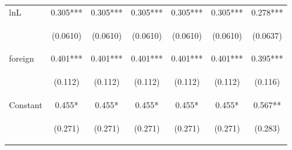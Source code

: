 \begin{center}
\begin{tabular}{lcccccc}
lnL & 0.305*** & 0.305*** & 0.305*** & 0.305*** & 0.305*** & 0.278*** \\
\vspace{4pt} & \begin{footnotesize}(0.0610)\end{footnotesize} & \begin{footnotesize}(0.0610)\end{footnotesize} & \begin{footnotesize}(0.0610)\end{footnotesize} & \begin{footnotesize}(0.0610)\end{footnotesize} & \begin{footnotesize}(0.0610)\end{footnotesize} & \begin{footnotesize}(0.0637)\end{footnotesize} \\
foreign & 0.401*** & 0.401*** & 0.401*** & 0.401*** & 0.401*** & 0.395*** \\
\vspace{4pt} & \begin{footnotesize}(0.112)\end{footnotesize} & \begin{footnotesize}(0.112)\end{footnotesize} & \begin{footnotesize}(0.112)\end{footnotesize} & \begin{footnotesize}(0.112)\end{footnotesize} & \begin{footnotesize}(0.112)\end{footnotesize} & \begin{footnotesize}(0.116)\end{footnotesize} \\
Constant & 0.455* & 0.455* & 0.455* & 0.455* & 0.455* & 0.567** \\
 & \begin{footnotesize}(0.271)\end{footnotesize} & \begin{footnotesize}(0.271)\end{footnotesize} & \begin{footnotesize}(0.271)\end{footnotesize} & \begin{footnotesize}(0.271)\end{footnotesize} & \begin{footnotesize}(0.271)\end{footnotesize} & \begin{footnotesize}(0.283)\end{footnotesize} \\

\end{tabular}
\end{center}
